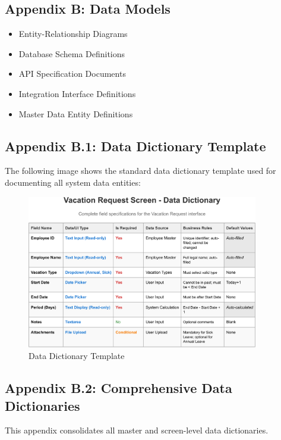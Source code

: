 \documentclass[12pt,a4paper]{article}
\begin{document}
\subsection{Appendix B: Data Models}
\begin{itemize}
    \item Entity-Relationship Diagrams
    \item Database Schema Definitions
    \item API Specification Documents
    \item Integration Interface Definitions
    \item Master Data Entity Definitions
\end{itemize}

\subsection{Appendix B.1: Data Dictionary Template}
The following image shows the standard data dictionary template used for documenting all system data entities:

\begin{figure}[H]
\centering
\includegraphics[width=0.9\textwidth]{Data-Dictionary/Data-Dictionary-Template/Data-Dictionary-Template-1.png}
\caption{Data Dictionary Template}
\label{fig:data-dictionary-template}
\end{figure}

\subsection{Appendix B.2: Comprehensive Data Dictionaries}
This appendix consolidates all master and screen-level data dictionaries.
\end{document}
